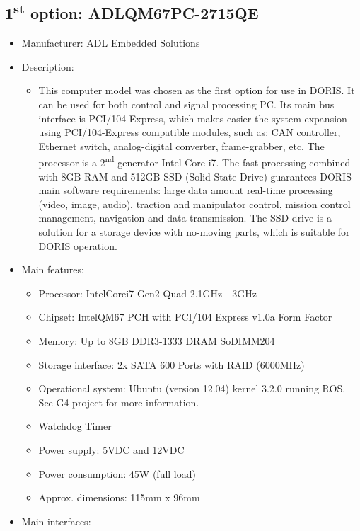 \subsection{1\textsuperscript{st} option: ADLQM67PC-2715QE}
\begin{itemize}
  \item Manufacturer: ADL Embedded Solutions\texttrademark
  \item Description:
  \begin{itemize}
    \item This computer model was chosen as the first option for use in DORIS. It can be used for both control and signal processing PC. Its main bus interface is PCI/104-Express, which makes easier the system expansion using PCI/104-Express compatible modules, such as: CAN controller, Ethernet switch, analog-digital converter, frame-grabber, etc. The processor is a 2\textsuperscript{nd} generator Intel Core i7. The fast processing combined with 8GB RAM and 512GB SSD (Solid-State Drive) guarantees DORIS main software requirements: large data amount real-time processing (video, image, audio), traction and manipulator control, mission control management, navigation and data transmission. The SSD drive is a solution for a storage device with no-moving parts, which is suitable for DORIS operation.
  \end{itemize}
  \item Main features:
  \begin{itemize}
    \item Processor: Intel\textregistered Core\texttrademark i7 Gen2 Quad 2.1GHz - 3GHz
    \item Chipset: Intel\textregistered QM67 PCH with PCI/104 Express v1.0a Form Factor
    \item Memory: Up to 8GB DDR3-1333 DRAM SoDIMM204
    \item Storage interface: 2x SATA 600 Ports with RAID (6000MHz)
    \item Operational system: Ubuntu (version 12.04) kernel 3.2.0 running ROS. See G4 project for more information.
    \item Watchdog Timer
    \item Power supply: 5VDC and 12VDC
    \item Power consumption: 45W (full load)
    \item Approx. dimensions: 115mm x 96mm
  \end{itemize}
  \item Main interfaces:
  \begin{itemize}

\end{itemize}
\end{itemize}

